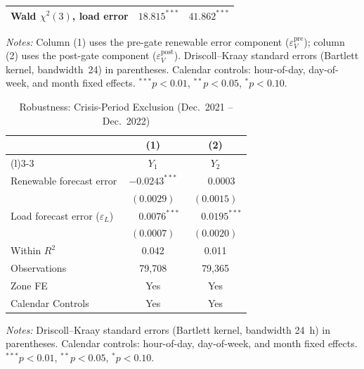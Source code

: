 \begin{table}[htbp]
\begin{threeparttable}
\begin{tabularx}{\linewidth}{>{\raggedright\arraybackslash}Xcc}
Wald $\chi^2(3)$, load error & $18.815^{***}$ & $41.862^{***}$ \\
\bottomrule
\end{tabularx}
\begin{tablenotes}[flushleft]
\footnotesize
\item \textit{Notes:} Column (1) uses the pre-gate renewable error component ($\varepsilon_V^{\mathrm{pre}}$); column (2) uses the post-gate component ($\varepsilon_V^{\mathrm{post}}$). Driscoll--Kraay standard errors (Bartlett kernel, bandwidth~24) in parentheses. Calendar controls: hour-of-day, day-of-week, and month fixed effects. $^{***}p<0.01$, $^{**}p<0.05$, $^{*}p<0.10$.
\end{tablenotes}
\end{threeparttable}
\end{table}

\begin{table}[htbp]
\centering
\caption{Robustness: Crisis-Period Exclusion (Dec.~2021 -- Dec.~2022)}
\label{tab:r1_crisis}
\begin{threeparttable}
\begin{tabularx}{\linewidth}{>{\raggedright\arraybackslash}Xcc}
\toprule
 & (1) & (2) \\
\cmidrule(r){2-2}\cmidrule(l){3-3}
 & $Y_1$ & $Y_2$ \\
\midrule
Renewable forecast error & $-0.0243^{***}$ & $\phantom{-}0.0003$ \\
 & $(0.0029)$ & $(0.0015)$ \\[0.4ex]
Load forecast error ($\varepsilon_L$) & $\phantom{-}0.0076^{***}$ & $\phantom{-}0.0195^{***}$ \\
 & $(0.0007)$ & $(0.0020)$ \\
\midrule
Within $R^2$ & 0.042 & 0.011 \\
Observations & 79,708 & 79,365 \\
Zone FE & Yes & Yes \\
Calendar Controls & Yes & Yes \\
\bottomrule
\end{tabularx}
\begin{tablenotes}[flushleft]
\footnotesize
\item \textit{Notes:} Driscoll--Kraay standard errors (Bartlett kernel, bandwidth 24~h) in parentheses. Calendar controls: hour-of-day, day-of-week, and month fixed effects. $^{***}p<0.01$, $^{**}p<0.05$, $^{*}p<0.10$.
\end{tablenotes}
\end{threeparttable}
\end{table}

